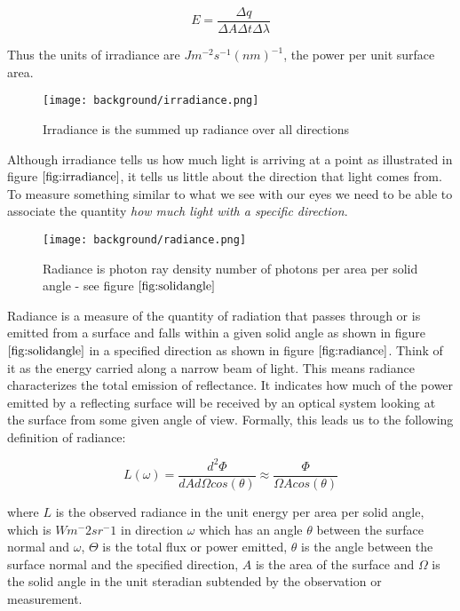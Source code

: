 \begin{equation}
 E = \frac{\Delta q}{\Delta A \Delta t \Delta \lambda}
\end{equation}

Thus the units of irradiance are $Jm^{-2}s^{-1}(nm)^{-1}$, the power per unit surface area.

\begin{figure}[H]
  \centering
  \texttt{[image: background/irradiance.png]}
  \caption{Irradiance is the summed up radiance over all directions}
  \label{fig:irradiance}
\end{figure}

Although irradiance tells us how much light is arriving at a point as illustrated in figure $\ref{fig:irradiance}$, it tells us little about the direction that light comes from. To measure something similar to what we see with our eyes we need to be able to associate the quantity \textit{how much light with a specific direction}. 

\begin{figure}[H]
  \centering
  \texttt{[image: background/radiance.png]}
  \caption{Radiance is photon ray density number of photons per area per solid angle - see figure $\ref{fig:solidangle}$}
  \label{fig:radiance}
\end{figure}

Radiance is a measure of the quantity of radiation that passes through or is emitted from a surface and falls within a given solid angle as shown in figure $\ref{fig:solidangle}$ in a specified direction as shown in figure $\ref{fig:radiance}$. Think of it as the energy carried along a narrow beam of light. This means radiance characterizes the total emission of reflectance. It indicates how much of the power emitted by a reflecting surface will be received by an optical system looking at the surface from some given angle of view. Formally, this leads us to the following definition of radiance: 

\begin{equation}
 L(\omega) = \frac{d^2 \Phi}{dA d\Omega cos(\theta)} \approx \frac{\Phi}{\Omega A cos(\theta)}
\end{equation}

where $L$ is the observed radiance in the unit energy per area per solid angle, which is $Wm^-2 sr^-1$ in direction $\omega$ which has an angle $\theta$ between the surface normal and $\omega$, $\Theta$ is the total flux or power emitted, $\theta$ is the angle between the surface normal and the specified direction, $A$ is the area of the surface and $\Omega$ is the solid angle in the unit steradian subtended by the observation or measurement.

